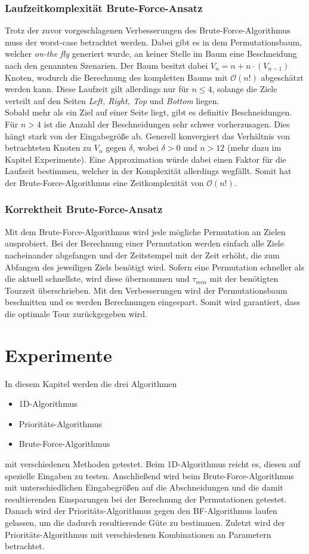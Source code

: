 \documentclass[german,version-2019-11]{uzl-thesis}
\begin{document}
\subsection{Laufzeitkomplexität Brute-Force-Ansatz}
Trotz der zuvor vorgeschlagenen Verbesserungen des Brute-Force-Algorithmus muss der worst-case betrachtet werden. Dabei gibt es in dem Permutationsbaum, welcher \emph{on-the fly} generiert wurde, an keiner Stelle im Baum eine Beschneidung nach den genannten Szenarien. Der Baum besitzt dabei $V_n = n + n\cdot (V_{n-1})$ Knoten, wodurch die Berechnung des kompletten Baums mit $\mathcal{O}(n!)$ abgeschätzt werden kann. Diese Laufzeit gilt allerdings nur für $n\leq 4$, solange die Ziele verteilt auf den Seiten \emph{Left, Right, Top} und \emph{Bottom} liegen.\\
Sobald mehr als ein Ziel auf einer Seite liegt, gibt es definitiv Beschneidungen. Für $n>4$ ist die Anzahl der Beschneidungen sehr schwer vorherzusagen. Dies hängt stark von der Eingabegröße ab. Generell konvergiert das Verhältnis von betrachteten Knoten zu $V_n$ gegen $\delta$, wobei $\delta>0$ und $n>12$ (mehr dazu im Kapitel Experimente). Eine Approximation würde dabei einen Faktor für die Laufzeit bestimmen, welcher in der Komplexität allerdings wegfällt. Somit hat der Brute-Force-Algorithmus eine Zeitkomplexität von $\mathcal{O}(n!)$.

\subsection{Korrektheit Brute-Force-Ansatz}
Mit dem Brute-Force-Algorithmus wird jede mögliche Permutation an Zielen ausprobiert. Bei der Berechnung einer Permutation werden einfach alle Ziele nacheinander abgefangen und der Zeitstempel mit der Zeit erhöht, die zum Abfangen des jeweiligen Ziels benötigt wird. Sofern eine Permutation schneller als die aktuell schnellste, wird diese übernommen und $\tau_{min}$ mit der benötigten Tourzeit überschrieben. Mit den Verbesserungen wird der Permutationsbaum beschnitten und es werden Berechnungen eingespart. Somit wird garantiert, dass die optimale Tour zurückgegeben wird.


\chapter{Experimente}

In diesem Kapitel werden die drei Algorithmen
\begin{itemize}
\item 1D-Algorithmus
\item Prioritäts-Algorithmus
\item Brute-Force-Algorithmus
\end{itemize}
mit verschiedenen Methoden getestet. Beim 1D-Algorithmus reicht es, diesen auf spezielle Eingaben zu testen. Anschließend wird beim Brute-Force-Algorithmus mit unterschiedlichen Eingabegrößen auf die Abschneidungen und die damit resultierenden Einsparungen bei der Berechnung der Permutationen getestet. Danach wird der Prioritäts-Algorithmus gegen den BF-Algorithmus laufen gelassen, um die dadurch resultierende Güte zu bestimmen. Zuletzt wird der Prioritäts-Algorithmus mit verschiedenen Kombinationen an Parametern betrachtet. 
\end{document}

